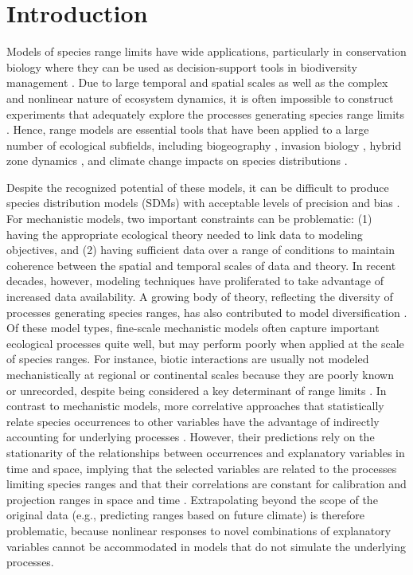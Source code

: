 \documentclass[11pt]{article}
\begin{document}
%
%

\section*{Introduction}

Models of species range limits have wide applications, particularly in conservation biology where they can be used as decision-support tools in biodiversity management \citep{Guisan2013}.
Due to large temporal and spatial scales as well as the complex and nonlinear nature of ecosystem dynamics, it is often impossible to construct experiments that adequately explore the processes generating species range limits \citep{Wu1995, Levin1998}. 
Hence, range models are essential tools that have been applied to a large number of ecological subfields, including biogeography \citep{Schurr2012}, invasion biology \citep{Catterall2012, Gallien2012}, hybrid zone dynamics \citep{Engler2013}, and climate change impacts on species distributions \citep{Blois2013, Thuiller2014}. 

Despite the recognized potential of these models, it can be difficult to produce species distribution models (SDMs) with acceptable levels of precision and bias \citep{Guisan2013}.
For mechanistic models, two important constraints can be problematic: (1) having the appropriate ecological theory needed to link data to modeling objectives, and (2) having sufficient data over a range of conditions to maintain coherence between the spatial and temporal scales of data and theory.
In recent decades, however, modeling techniques have proliferated to take advantage of increased data availability. 
A growing body of theory, reflecting the diversity of processes generating species ranges, has also contributed to model diversification \citep{Boulangeat2012}.
Of these model types, fine-scale mechanistic models often capture important ecological processes quite well, but may perform poorly when applied at the scale of species ranges.
For instance, biotic interactions are usually not modeled mechanistically at regional or continental scales because they are poorly known or unrecorded, despite being considered a key determinant of range limits \citep{Pigot2013}. 
In contrast to mechanistic models, more correlative approaches that statistically relate species occurrences to other variables have the advantage of indirectly accounting for underlying processes \citep{Guisan2000}.
However, their predictions rely on the stationarity of the relationships between occurrences and explanatory variables in time and space, implying that the selected variables are related to the processes limiting species ranges and that their correlations are constant for calibration and projection ranges in space and time \citep{Dormann2007}. 
Extrapolating beyond the scope of the original data (e.g., predicting ranges based on future climate) is therefore problematic, because nonlinear responses to novel combinations of explanatory variables cannot be accommodated in models that do not simulate the underlying processes.
\end{document}
